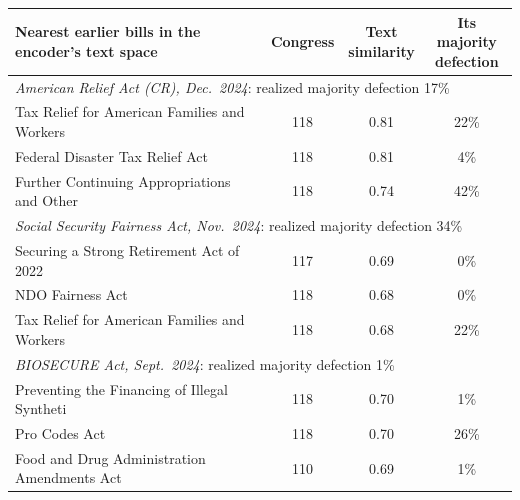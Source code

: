 \begin{tabular}{p{7.8cm}ccc}
\toprule
Nearest earlier bills in the encoder's text space & Congress & \shortstack{Text\\similarity} & \shortstack{Its majority\\defection} \\
\midrule
\multicolumn{4}{l}{\emph{American Relief Act (CR), Dec.\ 2024}: realized majority defection 17\%} \\
\quad Tax Relief for American Families and Workers & 118 & 0.81 & 22\% \\
\quad Federal Disaster Tax Relief Act & 118 & 0.81 & 4\% \\
\quad Further Continuing Appropriations and Other  & 118 & 0.74 & 42\% \\
\multicolumn{4}{l}{\emph{Social Security Fairness Act, Nov.\ 2024}: realized majority defection 34\%} \\
\quad Securing a Strong Retirement Act of 2022 & 117 & 0.69 & 0\% \\
\quad NDO Fairness Act & 118 & 0.68 & 0\% \\
\quad Tax Relief for American Families and Workers & 118 & 0.68 & 22\% \\
\multicolumn{4}{l}{\emph{BIOSECURE Act, Sept.\ 2024}: realized majority defection 1\%} \\
\quad Preventing the Financing of Illegal Syntheti & 118 & 0.70 & 1\% \\
\quad Pro Codes Act & 118 & 0.70 & 26\% \\
\quad Food and Drug Administration Amendments Act  & 110 & 0.69 & 1\% \\
\bottomrule
\end{tabular}

